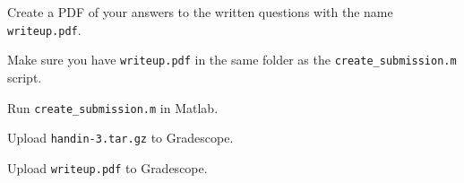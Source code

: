 \documentclass{16384_doc} %
\begin{document}
\begin{submissionChecklist}
			\item Create a PDF of your answers to the written questions with the name \verb!writeup.pdf!.
		\item Make sure you have \verb!writeup.pdf! in the same folder as the \verb!create_submission.m! script.
		\item Run \verb!create_submission.m! in Matlab.
		\item Upload \verb!handin-3.tar.gz! to Gradescope.
		\item Upload \verb!writeup.pdf! to Gradescope.
	\end{submissionChecklist}
\end{document}
